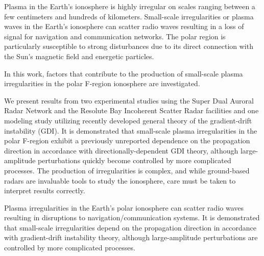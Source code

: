 

Plasma in the Earth's ionosphere is highly irregular on scales ranging
between a few centimeters and hundreds of kilometers. Small-scale
irregularities or plasma waves in the Earth's ionosphere can scatter radio waves resulting in a loss of
signal for navigation and communication networks. The polar region is
particularly susceptible to strong disturbances due to its direct connection with
the Sun's magnetic field and energetic particles. 

In this work, factors that
contribute to the production of small-scale plasma irregularities in the polar
F-region ionosphere are investigated. 

We present results from two
experimental studies using the Super Dual Auroral Radar Network and the
Resolute Bay Incoherent Scatter Radar facilities and one modeling study
utilizing recently developed general theory of the gradient-drift instability
(GDI). It is demonstrated that small-scale plasma irregularities in the polar
F-region exhibit a previously unreported dependence on the propagation
direction in accordance with directionally-dependent GDI theory, although
large-amplitude perturbations quickly become controlled by more complicated
processes. The production of irregularities is complex, and while ground-based
radars are invaluable tools to study the ionosphere, care must be taken to
interpret results correctly.





Plasma irregularities in the Earth's polar ionosphere can scatter radio waves resulting in disruptions to navigation/communication systems. It is demonstrated that small-scale irregularities depend on the propagation direction in accordance with gradient-drift instability theory, although large-amplitude perturbations are controlled by more complicated processes.
